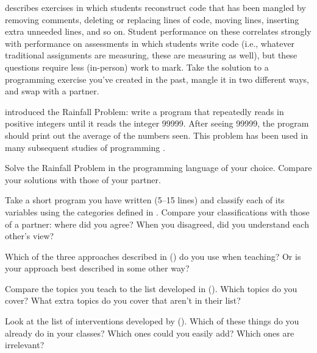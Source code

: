 
\cite{Chen2017} describes exercises in which students reconstruct
code that has been mangled by removing comments, deleting or replacing
lines of code, moving lines, inserting extra unneeded lines, and so on.
Student performance on these correlates strongly with performance on
assessments in which students write code (i.e., whatever traditional
assignments are measuring, these are measuring as well), but these
questions require less (in-person) work to mark. Take the solution to a
programming exercise you've created in the past, mangle it in two
different ways, and swap with a partner.


\cite{Solo1986} introduced the Rainfall Problem: write a program that
repeatedly reads in positive integers until it reads the integer 99999.
After seeing 99999, the program should print out the average of the
numbers seen. This problem has been used in many subsequent studies of
programming \cite{Fisl2014,Simo2013,Sepp2015}.

Solve the Rainfall Problem in the programming language of your choice.
Compare your solutions with those of your partner.


Take a short program you have written (5--15 lines) and classify each of
its variables using the categories defined in
. Compare your classifications with those
of a partner: where did you agree? When you disagreed, did you
understand each other's view?


Which of the three approaches described in \cite{Sorv2014}
() do you use when teaching? Or is your approach
best described in some other way?


Compare the topics you teach to the list developed in \cite{Luxt2017}
(). Which topics do you cover? What extra topics
do you cover that aren't in their list?


Look at the list of interventions developed by \cite{Viha2014}
(). Which of these things do you already do in
your classes? Which ones could you easily add? Which ones are
irrelevant?

